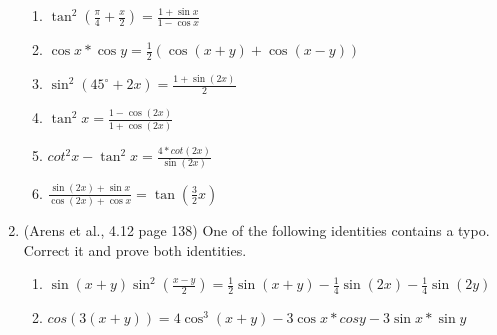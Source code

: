 \documentclass[a4paper,onecolumn,draft,pdftex]{report}
\begin{document}
\begin{enumerate}
\begin{enumerate}
                \item $\tan^2(\frac{\pi}{4}+\frac{x}{2})=\frac{1+\sin x}{1-\cos x}$
                \item $\cos x*\cos y=\frac{1}{2}(\cos(x+y)+\cos(x-y))$
                \item $\sin^2(45^\circ+2x)=\frac{1+\sin(2x)}{2}$
                \item $\tan^2 x=\frac{1-\cos(2x)}{1+\cos(2x)}$
                \item $cot^2 x-\tan^2 x=\frac{4*cot(2x)}{\sin(2x)}$
                \item $\frac{\sin(2x)+\sin x}{\cos(2x)+\cos x}=\tan(\frac{3}{2}x)$
            \end{enumerate}
        \item (Arens et al., 4.12 page 138) One of the following identities contains a typo. Correct it and prove both identities.
            \begin{enumerate}
                \item $\sin(x+y)\sin^2(\frac{x-y}{2})=\frac{1}{2}\sin(x+y)-\frac{1}{4}\sin(2x)-\frac{1}{4}\sin(2y)$
                \item $cos(3(x+y))=4\cos^3(x+y)-3\cos x*cos y-3\sin x*\sin y$
            \end{enumerate}
    \end{enumerate}
\end{document}
